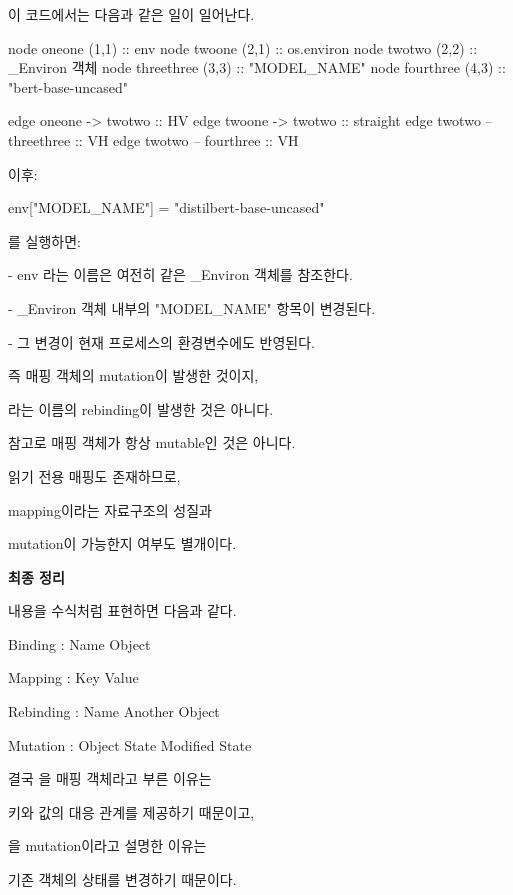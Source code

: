 이 코드에서는 다음과 같은 일이 일어난다.
\dhkdiagramspacing{8mm}{3mm}
\begin{dhkdiagram}[in=4]
node oneone (1,1) :: env
node twoone (2,1) :: os.environ
node twotwo (2,2) :: _Environ 객체
node threethree (3,3) :: "MODEL_NAME"
node fourthree (4,3) :: "bert-base-uncased"

edge oneone -> twotwo :: HV
edge twoone -> twotwo :: straight
edge twotwo -- threethree :: VH
edge twotwo -- fourthree :: VH
\end{dhkdiagram}

이후:

\begin{dhkcode}
env["MODEL_NAME"] = "distilbert-base-uncased"
\end{dhkcode}

를 실행하면:

\begin{dhksmry}
    - env 라는 이름은 여전히 같은 _Environ 객체를 참조한다.

    - _Environ 객체 내부의 "MODEL_NAME" 항목이 변경된다.

    - 그 변경이 현재 프로세스의 환경변수에도 반영된다.
\end{dhksmry}

즉 매핑 객체의 mutation이 발생한 것이지,

라는 이름의 rebinding이 발생한 것은 아니다.

참고로 매핑 객체가 항상 mutable인 것은 아니다.

읽기 전용 매핑도 존재하므로,

\begin{dhksmry}[centered]
mapping이라는 자료구조의 성질과

mutation이 가능한지 여부도 별개이다.
\end{dhksmry}

\textbf{최종 정리}

내용을 수식처럼 표현하면 다음과 같다.

\begin{dhksmry}
    Binding : Name \ra Object

    Mapping : Key \ra Value

    Rebinding : Name \ra Another Object

    Mutation : Object State \ra Modified State
\end{dhksmry}

결국 을 매핑 객체라고 부른 이유는 

키와 값의 대응 관계를 제공하기 때문이고, 

을 mutation이라고 설명한 이유는 

기존 객체의 상태를 변경하기 때문이다.